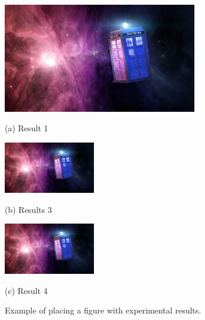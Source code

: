 \documentclass{article}
\begin{document}
\begin{figure}[htb]

\begin{minipage}[b]{1.0\linewidth}
  \centering
  \centerline{\includegraphics[width=8.5cm]{image1}}
  \centerline{(a) Result 1}\medskip
\end{minipage}
%
\begin{minipage}[b]{.48\linewidth}
  \centering
  \centerline{\includegraphics[width=4.0cm]{image3}}
  \centerline{(b) Results 3}\medskip
\end{minipage}
\hfill
\begin{minipage}[b]{0.48\linewidth}
  \centering
  \centerline{\includegraphics[width=4.0cm]{image4}}
  \centerline{(c) Result 4}\medskip
\end{minipage}
%
\caption{Example of placing a figure with experimental results.}
\label{fig:res}
%
\end{figure}



\vfill\pagebreak
\printbibliography
\end{document}
